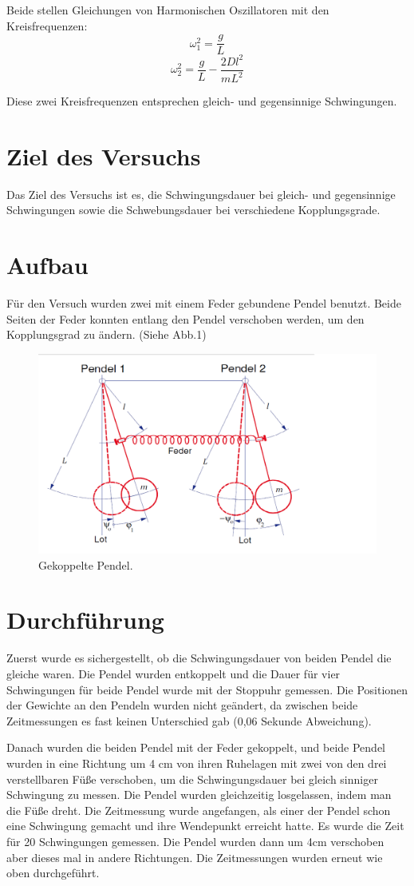 \documentclass[11pt,a4paper]{article}
\begin{document}
Beide stellen Gleichungen von Harmonischen Oszillatoren mit den Kreisfrequenzen:
$$ \omega_1^2 = \frac{g}{L}$$
$$ \omega_2^2 = \frac{g}{L}-\frac{2Dl^2}{mL^2} $$

Diese zwei Kreisfrequenzen entsprechen gleich- und gegensinnige Schwingungen. 

\section{Ziel des Versuchs}
Das Ziel des Versuchs ist es, die Schwingungsdauer bei gleich- und gegensinnige Schwingungen sowie die Schwebungsdauer bei verschiedene Kopplungsgrade. 
\section{Aufbau}
Für den Versuch wurden zwei mit einem Feder gebundene Pendel benutzt. Beide Seiten der Feder konnten entlang den Pendel verschoben werden, um den Kopplungsgrad zu ändern. 
(Siehe Abb.1)
\begin{figure}
	\centering
	\includegraphics[scale=0.5]{ver19}
	\caption { Gekoppelte Pendel. }
\end{figure}

\section{Durchführung}
Zuerst wurde es sichergestellt, ob die Schwingungsdauer von beiden Pendel die gleiche waren. Die Pendel wurden entkoppelt und die Dauer für vier Schwingungen für beide Pendel wurde mit der Stoppuhr gemessen. Die Positionen der Gewichte an den Pendeln wurden nicht geändert, da zwischen beide Zeitmessungen es fast keinen Unterschied gab (0,06 Sekunde Abweichung).

Danach wurden die beiden Pendel mit der Feder gekoppelt, und beide Pendel wurden in eine Richtung um 4 cm von ihren Ruhelagen mit zwei von den drei verstellbaren Füße verschoben, um die Schwingungsdauer bei gleich sinniger Schwingung zu messen. Die Pendel wurden gleichzeitig losgelassen, indem man die Füße dreht. Die Zeitmessung wurde angefangen, als einer der Pendel schon eine Schwingung gemacht und ihre Wendepunkt erreicht hatte. Es wurde die Zeit für 20 Schwingungen gemessen. Die Pendel wurden dann um 4cm verschoben aber dieses mal in andere Richtungen. Die Zeitmessungen wurden erneut wie oben durchgeführt. 
\end{document}
